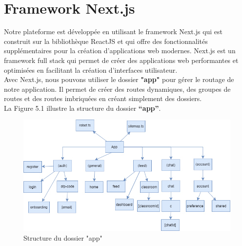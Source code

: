 \section{Framework Next.js}
Notre plateforme est développée en utilisant le framework Next.js qui est construit sur la bibliothèque ReactJS et qui offre des fonctionnalités supplémentaires pour la création d'applications web modernes. Next.js est un framework full stack qui permet de créer des applications web performantes et optimisées en facilitant la création d'interfaces utilisateur.\\
Avec Next.js, nous pouvons utiliser le dossier \textbf{"app"} pour gérer le routage de notre application. Il permet de créer des routes dynamiques, des groupes de routes et des routes imbriquées en créant simplement des dossiers.\\
La Figure 5.1 illustre la structure du dossier \textbf{“app”}.\\
\begin{figure}[H]
    \centering
    \includegraphics[width=\textwidth,height=0.6\textwidth]{images/chp5/fig1.png}
    \caption{Structure du dossier "app"}
    \label{fig:Structure du dossier "app"}    
\end{figure}

